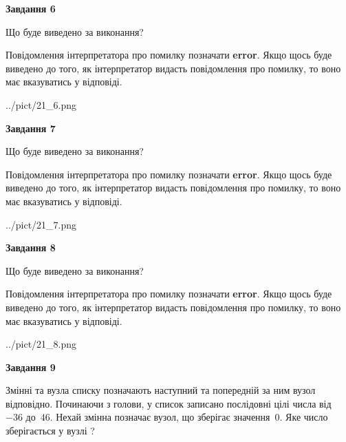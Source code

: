 \documentclass[12pt, ukrainian]{article}
\begin{document}
{\begin {large}
{\begin {center}\textbf{Завдання 6}\end {center}}\par
Що буде виведено за виконання?

Повідомлення інтерпретатора про помилку позначати \textbf{error}.
Якщо щось буде виведено до того, як інтерпретатор видасть повідомлення про помилку, 
то воно має вказуватись у відповіді. \par


\begin{center}
	{../pict/21_6.png}
\end{center}
\newpage

{\begin {center}\textbf{Завдання 7}\end {center}}\par
Що буде виведено за виконання?

Повідомлення інтерпретатора про помилку позначати \textbf{error}.
Якщо щось буде виведено до того, як інтерпретатор видасть повідомлення про помилку, 
то воно має вказуватись у відповіді. \par


\begin{center}
	{../pict/21_7.png}
\end{center}
\newpage

{\begin {center}\textbf{Завдання 8}\end {center}}\par
Що буде виведено за виконання?

Повідомлення інтерпретатора про помилку позначати \textbf{error}.
Якщо щось буде виведено до того, як інтерпретатор видасть повідомлення про помилку, 
то воно має вказуватись у відповіді. \par


\begin{center}
	{../pict/21_8.png}
\end{center}
\newpage

{\begin {center}\textbf{Завдання 9}\end {center}}\par
Змінні  та  вузла списку позначають наступний та попередній за ним вузол відповідно. Починаючи з голови, у список записано послідовні цілі числа від~$-36$ до~$46$. Нехай змінна  позначає вузол, що зберігає значення~$0$.
Яке число зберігається у вузлі  ?\par
\newpage


\end{large}}
\end{document}
